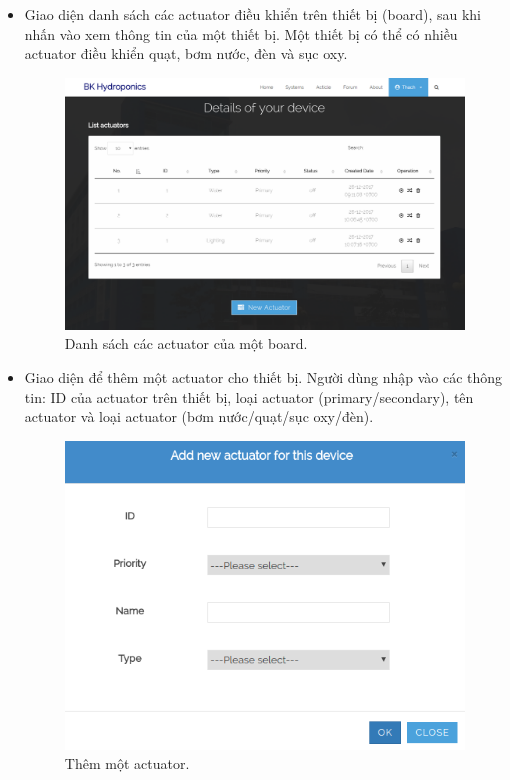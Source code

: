 \documentclass[a4paper,12pt,oneside]{article}
\begin{document}
\begin{itemize}
\item Giao diện danh sách các actuator điều khiển trên thiết bị (board), sau khi nhấn vào xem thông tin của một thiết bị. Một thiết bị có thể có nhiều actuator điều khiển quạt, bơm nước, đèn và sục oxy.
\begin{figure}[H]
\centering
\includegraphics[scale=.4]{hinh/web_actuator_list.png}
\caption{Danh sách các actuator của một board.}
\end{figure}

\item Giao diện để thêm một actuator cho thiết bị. Người dùng nhập vào các thông tin: ID của actuator trên thiết bị, loại actuator (primary/secondary), tên actuator và loại actuator (bơm nước/quạt/sục oxy/đèn).
\begin{figure}[H]
\centering
\includegraphics[scale=.55]{hinh/web_add_actuator.png}
\caption{Thêm một actuator.}
\end{figure}


\end{itemize}
\end{document}

